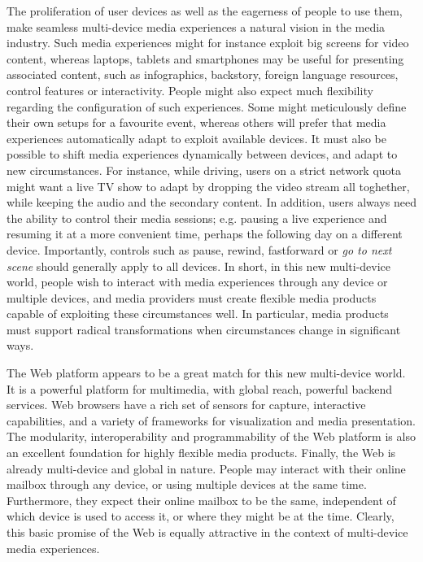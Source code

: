 The proliferation of user devices as well as the eagerness of people to use
them, make seamless multi-device media experiences a natural vision in the
media industry. Such media experiences might for instance exploit big screens
for video content, whereas laptops, tablets and smartphones may be useful for
presenting associated content, such as infographics, backstory, foreign
language resources, control features or interactivity. People might also
expect much flexibility regarding the configuration of such experiences. Some
might meticulously define their own setups for a favourite event, whereas
others will prefer that media experiences automatically adapt to exploit
available devices. It must also be possible to shift media experiences
dynamically between devices, and adapt to new circumstances. For instance,
while driving, users on a strict network quota might want a live TV show to
adapt by dropping the video stream all toghether, while keeping the audio and
the secondary content. In addition, users always need the ability to control
their media sessions; e.g. pausing a live experience and resuming it at a more
convenient time, perhaps the following day on a different device. Importantly,
controls such as pause, rewind, fastforward or \emph{go to next scene} should
generally apply to all devices. In short, in this new multi-device world,
people wish to interact with media experiences through any device or multiple
devices, and media providers must create flexible media products capable of
exploiting these circumstances well. In particular, media products must support
radical transformations when circumstances change in significant ways. 


The Web platform appears to be a great match for this new multi-device world. It
is a powerful platform for multimedia, with global reach, powerful backend
services. Web browsers have a rich set of sensors for capture, interactive
capabilities, and a variety of frameworks for visualization and media
presentation. The modularity, interoperability and programmability of the Web
platform is also an excellent foundation for highly flexible media products.
Finally, the Web is already multi-device and global in nature. People may
interact with their online mailbox through any device, or using multiple
devices at the same time. Furthermore, they expect their online mailbox to be
the same, independent of which device is used to access it, or where they
might be at the time. Clearly, this basic promise of the Web is equally
attractive in the context of multi-device media experiences.
 
